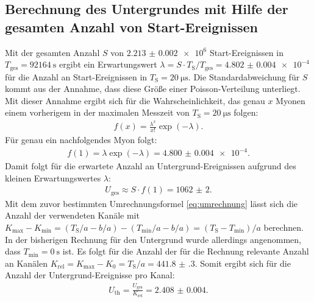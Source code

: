 \subsection{Berechnung des Untergrundes mit Hilfe der gesamten Anzahl von Start-Ereignissen}
\label{subsec:Berechnung}
Mit der gesamten Anzahl $S$ von $\num{2.213(2)e6}$ Start-Ereignissen in $T_\text{ges}=\SI{92164}{\second}$ ergibt ein Erwartungswert $\lambda=S \cdot T_\text{S}/T_\text{ges}=\num{4.802(4)e-4}$ für die Anzahl an Start-Ereignissen in $T_\text{S}=\SI{20}{\micro\second}$. Die Standardabweichung für $S$ kommt aus der Annahme, dass diese Größe einer Poisson-Verteilung unterliegt. Mit dieser Annahme ergibt sich für die Wahrscheinlichkeit, das genau $x$ Myonen einem vorherigem in der maximalen Messzeit von $T_\text{S}=\SI{20}{\micro\second}$ folgen: 
\begin{gather*}
f(x)=\frac{\lambda^x}{x!}\exp(-\lambda).
\end{gather*}
Für genau ein nachfolgendes Myon folgt:
\begin{gather*}
f(1)=\lambda\exp(-\lambda)=\num{4.800(4)e-4}.
\end{gather*}
Damit folgt für die erwartete Anzahl an Untergrund-Ereignissen aufgrund des kleinen Erwartungswertes $\lambda$:
\begin{gather*}
U_\text{ges}\approx S \cdot f(1) =\num{1062(2)}.
\end{gather*}
Mit dem zuvor bestimmten Umrechnungsformel \eqref{eq:umrechnung} lässt sich die Anzahl der verwendeten Kanäle mit $K_\text{max}-K_\text{min}=(T_\text{S}/a -b/a)-(T_\text{min}/a-b/a)= (T_\text{S}-T_\text{min})/a$ berechnen. In der bisherigen Rechnung für den Untergrund wurde allerdings angenommen, dass $T_\text{min} = \SI{0}{\second}$ ist. Es folgt für die Anzahl der für die Rechnung relevante Anzahl an Kanälen $K_\text{rel}=K_\text{max}-K_0= T_\text{S}/a=\num{441.8(3)}$.
Somit ergibt sich für die Anzahl der Untergrund-Ereignisse pro Kanal:
\begin{gather*}
U_\text{th}=\frac{U_\text{ges}}{K_\text{rel}} =\num{2.408(4)}.
\end{gather*}

